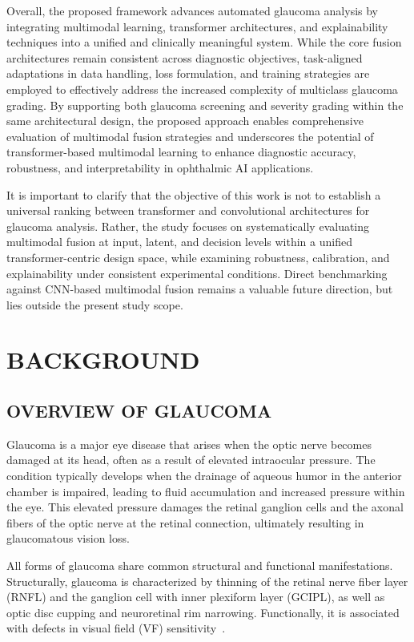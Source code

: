 \documentclass[preprint,12pt]{elsarticle}
\begin{document}
Overall, the proposed framework advances automated glaucoma analysis by integrating multimodal learning, transformer architectures, and explainability techniques into a unified and clinically meaningful system. While the core fusion architectures remain consistent across diagnostic objectives, task-aligned adaptations in data handling, loss formulation, and training strategies are employed to effectively address the increased complexity of multiclass glaucoma grading. By supporting both glaucoma screening and severity grading within the same architectural design, the proposed approach enables comprehensive evaluation of multimodal fusion strategies and underscores the potential of transformer-based multimodal learning to enhance diagnostic accuracy, robustness, and interpretability in ophthalmic AI applications.

It is important to clarify that the objective of this work is not to establish a universal ranking between transformer and convolutional architectures for glaucoma analysis. Rather, the study focuses on systematically evaluating multimodal fusion at input, latent, and decision levels within a unified transformer-centric design space, while examining robustness, calibration, and explainability under consistent experimental conditions. Direct benchmarking against CNN-based multimodal fusion remains a valuable future direction, but lies outside the present study scope.



\section{BACKGROUND}
\label{sec2}

\subsection{OVERVIEW OF GLAUCOMA}
\label{subsec21}

Glaucoma is a major eye disease that arises when the optic nerve becomes damaged at its head, often as a result of elevated intraocular pressure. The condition typically develops when the drainage of aqueous humor in the anterior chamber is impaired, leading to fluid accumulation and increased pressure within the eye. This elevated pressure damages the retinal ganglion cells and the axonal fibers of the optic nerve at the retinal connection, ultimately resulting in glaucomatous vision loss.

All forms of glaucoma share common structural and functional manifestations. Structurally, glaucoma is characterized by thinning of the retinal nerve fiber layer (RNFL) and the ganglion cell with inner plexiform layer (GCIPL), as well as optic disc cupping and neuroretinal rim narrowing. Functionally, it is associated with defects in visual field (VF) sensitivity~\cite{kanski10}.
\end{document}
